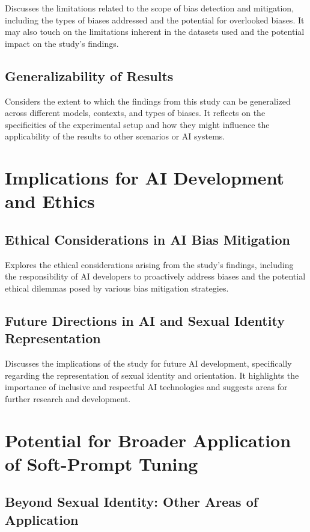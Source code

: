 Discusses the limitations related to the scope of bias detection and mitigation, including the types of biases addressed and the potential for overlooked biases. It may also touch on the limitations inherent in the datasets used and the potential impact on the study's findings.

\subsection{Generalizability of Results}

Considers the extent to which the findings from this study can be generalized across different models, contexts, and types of biases. It reflects on the specificities of the experimental setup and how they might influence the applicability of the results to other scenarios or AI systems.

\section{Implications for AI Development and Ethics}

\subsection{Ethical Considerations in AI Bias Mitigation}

Explores the ethical considerations arising from the study's findings, including the responsibility of AI developers to proactively address biases and the potential ethical dilemmas posed by various bias mitigation strategies.

\subsection{Future Directions in AI and Sexual Identity Representation}

Discusses the implications of the study for future AI development, specifically regarding the representation of sexual identity and orientation. It highlights the importance of inclusive and respectful AI technologies and suggests areas for further research and development.

\section{Potential for Broader Application of Soft-Prompt Tuning}

\subsection{Beyond Sexual Identity: Other Areas of Application}

